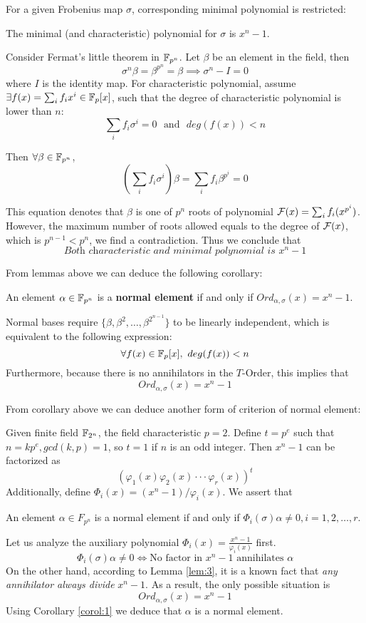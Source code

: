 For a given Frobenius map $\sigma$, corresponding minimal polynomial is restricted:
\begin{Lemma}
\label{lem:3}
The minimal (and characteristic) polynomial for $\sigma$ is $x^n-1$.
\end{Lemma}
\begin{Proof}
Consider Fermat's little theorem in ${\mathbb{F}}_{p^n}$. Let $\beta$ be an element in the field, then
$$\sigma^n\beta = \beta^{p^n} = \beta \implies \sigma^n-I = 0$$
where $I$ is the identity map. For characteristic polynomial, assume $\exists f(x) = \sum_i f_ix^i \in {\mathbb{F}}_p[x]$, 
such that the degree of characteristic polynomial is lower than $n$:
$$\sum_if_i\sigma^i = 0~~~\text{and}~~~deg(f(x))<n$$

Then $\forall \beta\in{\mathbb{F}}_{p^n}$, 
$$\left(\sum_if_i\sigma^i\right)\beta = \sum_if_i\beta^{p^i} = 0$$

This equation denotes that $\beta$ is one of $p^n$ roots of polynomial ${\mathcal{F}}(x) = \sum_if_i(x^{p^i})$.
However, the maximum number of roots allowed equals to the degree of ${\mathcal{F}}(x)$, which is 
$p^{n-1}<p^n$, we find a contradiction. Thus we conclude that
$$\textit{Both characteristic and minimal polynomial is }x^n-1$$
\end{Proof}

From lemmas above we can deduce the following corollary:
\begin{Corollary}
\label{corol:1}
An element $\alpha \in {\mathbb{F}}_{p^n}$ is a {\bf normal element} if and only if $Ord_{\alpha,\sigma}(x) = x^n-1$.
\end{Corollary}
\begin{Proof}
Normal bases require $\{\beta,\beta^2,\dots,\beta^{2^{n-1}}\}$ to be linearly independent,
which is equivalent to the following expression:
$$\forall f(x)\in {\mathbb{F}}_p[x],~deg(f(x))<n$$
Furthermore, because there is no annihilators in the $T$-Order, this implies that
$$Ord_{\alpha,\sigma}(x) = x^n-1$$
\end{Proof}

From corollary above we can deduce another form of criterion of normal element:
\begin{Theorem}
\label{thm:1}
Given finite field ${\mathbb{F}}_{2^n}$, the field characteristic $p = 2$.
Define $t = p^e$ such that $n = kp^e, gcd(k,p) = 1$, so $t=1$ if $n$ is an odd integer. Then 
$x^n - 1$ can be factorized as 
$$(\varphi_1(x)\varphi_2(x)\cdot\cdot\cdot\varphi_r(x))^t$$
Additionally, define $\Phi_i(x) = (x^n - 1)/\varphi_i(x)$. We assert that

An element $\alpha \in 	F_{p^n}$ is a normal element if and only if $\Phi_i(\sigma)\alpha \neq 0, i = 1,2,\dots,r$.
\end{Theorem}
\begin{Proof}
Let us analyze the auxiliary polynomial $\Phi_i(x) = \frac{x^n - 1}{\varphi_i(x)}$ first.
$$\Phi_i(\sigma)\alpha \neq 0 \Leftrightarrow \text{No factor in }x^n-1\text{ annihilates }\alpha$$
On the other hand, according to Lemma \ref{lem:3}, it is a known 
fact that \emph{any annihilator always divide} $x^n-1$. As a result, the only possible situation is
$$Ord_{\alpha,\sigma}(x) = x^n-1$$
Using Corollary \ref{corol:1} we deduce that $\alpha$ is a normal element.
\end{Proof}

